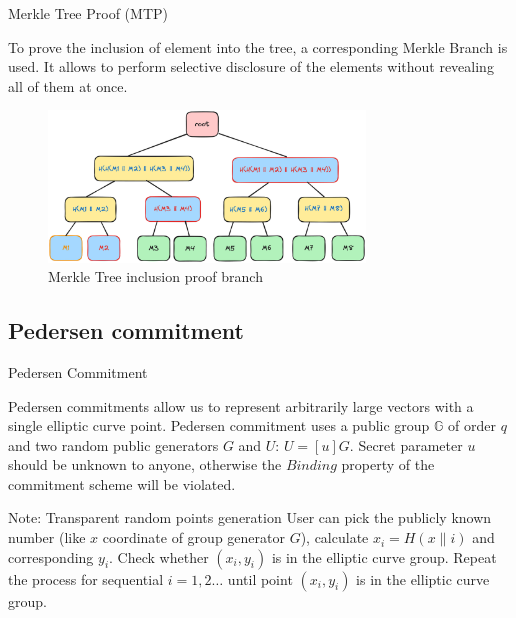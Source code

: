 \documentclass[xcolor={usenames,dvipsnames}]{beamer}
\begin{document}
    \begin{frame}{Merkle Tree Proof (MTP)}

        To prove the inclusion of element into the tree, a corresponding Merkle Branch is used. It allows to perform selective
        disclosure of the elements without revealing all of them at once.

        \begin{figure}
            \centering
            \includegraphics[width=0.75\textwidth]{images/lecture_5/MerkleTreeProof.png}
            \caption{Merkle Tree inclusion proof branch}
        \end{figure}

    \end{frame}

    \subsection{Pedersen commitment}

    \begin{frame}{Pedersen Commitment}

        Pedersen commitments allow us to represent arbitrarily large vectors with a single elliptic curve point. 
        Pedersen commitment uses a public group $\mathbb{G}$ of order $q$ and two random public generators
        $G$ and $U$: $U = [u]G$. Secret parameter $u$ should be unknown to anyone, otherwise the $\textit{Binding}$ 
        property of the commitment scheme will be violated.
    
        \begin{alertblock}{Note: Transparent random points generation}
            User can pick the publicly known number (like $x$ coordinate of group generator $G$), calculate $x_i = H(x \parallel i)$
            and corresponding $y_i$. Check whether $(x_i, y_i)$ is in the elliptic curve group. Repeat the process for sequential $i = 1, 2 \ldots$
            until point $(x_i, y_i)$ is in the elliptic curve group.
        \end{alertblock}    

    \end{frame}
\end{document}
